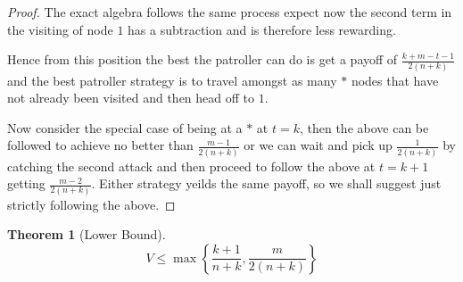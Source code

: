 \documentclass[a4paper,10pt]{article}
\newtheorem{theorem}{Theorem}[section]
\theoremstyle{definition}
\theoremstyle{definition}
\theoremstyle{remark}
\theoremstyle{definition}
\begin{document}
\begin{proof}
The exact algebra follows the same process expect now the second term in the visiting of node $1$ has a subtraction and is therefore less rewarding. 

Hence from this position the best the patroller can do is get a payoff of $\frac{k+m-t-1}{2(n+k)}$ and the best patroller strategy is to travel amongst as many $*$ nodes that have not already been visited and then head off to $1$.

Now consider the special case of being at a $*$ at $t=k$, then the above can be followed to achieve no better than $\frac{m-1}{2(n+k)}$ or we can wait and pick up $\frac{1}{2(n+k)}$ by catching the second attack and then proceed to follow the above at $t=k+1$ getting $\frac{m-2}{2(n+k)}$. Either strategy yeilds the same payoff, so we shall suggest just strictly following the above.
\end{proof}

\begin{theorem}[Lower Bound]
$$V \leq \max \left\{ \frac{k+1}{n+k} , \frac{m}{2(n+k)} \right\}$$
\end{theorem}
\end{document}
